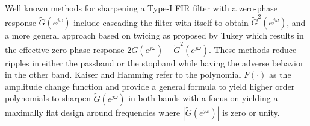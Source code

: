 \documentclass[journal] {IEEEtran}
\begin{document}
Well known methods for sharpening a Type-I FIR filter with a zero-phase response $\tilde{G}(e^{j\omega})$ include cascading the filter with itself to obtain $\tilde{G}^2(e^{j\omega})$, and a more general approach based on twicing as proposed by  Tukey \cite{Tukey} which results in the effective zero-phase response $2\tilde{G}(e^{j\omega})-\tilde{G}^2(e^{j\omega})$. These methods reduce ripples in either the passband or the stopband while having the adverse behavior in the other band. Kaiser and Hamming \cite{Kaiser1977} refer to the polynomial $F(\cdot)$ as the amplitude change function and provide a general formula to yield higher order polynomials to sharpen $\tilde{G}(e^{j\omega})$ in both bands with a focus on yielding a maximally flat design around frequencies where $|\tilde{G}(e^{j\omega})|$ is zero or unity.
\end{document}
